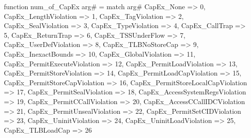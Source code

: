 function num_of_CapEx arg# = match arg# {
  CapEx_None => 0,
  CapEx_LengthViolation => 1,
  CapEx_TagViolation => 2,
  CapEx_SealViolation => 3,
  CapEx_TypeViolation => 4,
  CapEx_CallTrap => 5,
  CapEx_ReturnTrap => 6,
  CapEx_TSSUnderFlow => 7,
  CapEx_UserDefViolation => 8,
  CapEx_TLBNoStoreCap => 9,
  CapEx_InexactBounds => 10,
  CapEx_GlobalViolation => 11,
  CapEx_PermitExecuteViolation => 12,
  CapEx_PermitLoadViolation => 13,
  CapEx_PermitStoreViolation => 14,
  CapEx_PermitLoadCapViolation => 15,
  CapEx_PermitStoreCapViolation => 16,
  CapEx_PermitStoreLocalCapViolation => 17,
  CapEx_PermitSealViolation => 18,
  CapEx_AccessSystemRegsViolation => 19,
  CapEx_PermitCCallViolation => 20,
  CapEx_AccessCCallIDCViolation => 21,
  CapEx_PermitUnsealViolation => 22,
  CapEx_PermitSetCIDViolation => 23,
  CapEx_UninitViolation => 24,
  CapEx_UninitLoadViolation => 25,
  CapEx_TLBLoadCap => 26
}
